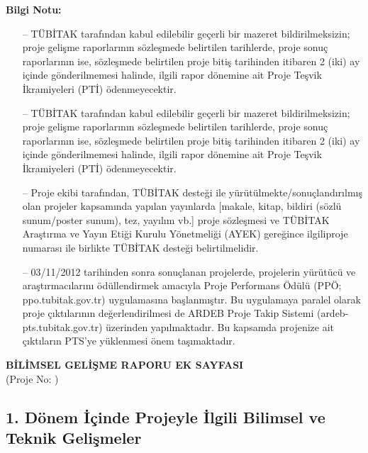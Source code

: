 \documentclass[a4paper,10pt]{article}
\newcommand{\hr}{\noindent\makebox[\linewidth]{\rule{\paperwidth}{0.4pt}}}
\begin{document}
\scriptsize

\textbf{Bilgi Notu:} \\

\begin{itemize}
\item [--] TÜBİTAK tarafından kabul edilebilir geçerli bir mazeret bildirilmeksizin; proje gelişme raporlarının sözleşmede belirtilen tarihlerde, proje sonuç raporlarının ise, sözleşmede belirtilen proje bitiş tarihinden itibaren 2 (iki) ay içinde gönderilmemesi halinde, ilgili rapor dönemine ait Proje Teşvik İkramiyeleri (PTİ) ödenmeyecektir. 


\item [--]  TÜBİTAK tarafından kabul edilebilir geçerli bir mazeret bildirilmeksizin; proje gelişme raporlarının sözleşmede belirtilen tarihlerde, proje sonuç raporlarının ise, sözleşmede belirtilen proje bitiş tarihinden itibaren 2 (iki) ay içinde gönderilmemesi halinde, ilgili rapor dönemine ait Proje Teşvik İkramiyeleri (PTİ) ödenmeyecektir. 

\item [--]  Proje ekibi tarafından, TÜBİTAK desteği ile yürütülmekte/sonuçlandırılmış olan projeler kapsamında yapılan yayınlarda [makale, kitap, bildiri (sözlü sunum/poster sunum), tez, yayılım vb.] proje sözleşmesi ve TÜBİTAK Araştırma ve Yayın Etiği Kurulu Yönetmeliği (AYEK) gereğince ilgiliproje numarası ile birlikte TÜBİTAK desteği belirtilmelidir.

\item [--]  03/11/2012 tarihinden sonra sonuçlanan projelerde, projelerin yürütücü ve araştırmacılarını ödüllendirmek amacıyla Proje Performans Ödülü (PPÖ; ppo.tubitak.gov.tr) uygulamasına başlanmıştır. Bu uygulamaya paralel olarak proje çıktılarının değerlendirilmesi de ARDEB Proje Takip Sistemi (ardeb-pts.tubitak.gov.tr) üzerinden yapılmaktadır. Bu kapsamda projenize ait çıktıların PTS'ye yüklenmesi önem taşımaktadır.	

\end{itemize}

\normalsize
\newpage
\begin{center}
\textbf{BİLİMSEL GELİŞME RAPORU EK SAYFASI}\\
(Proje No: \projeno)
\end{center}
\hr

\noindent\subsection*{1. Dönem İçinde Projeyle İlgili Bilimsel ve Teknik Gelişmeler}
\null 
\end{document}
